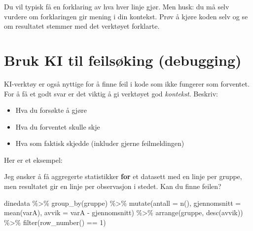 \documentclass[
  norsk,
  letterpaper,
  DIV=11,
  numbers=noendperiod]{scrreprt}
\newenvironment{Shaded}{\begin{snugshade}}{\end{snugshade}}
\newcommand{\AttributeTok}[1]{\textcolor[rgb]{0.40,0.45,0.13}{#1}}
\newcommand{\ControlFlowTok}[1]{\textcolor[rgb]{0.00,0.23,0.31}{\textbf{#1}}}
\newcommand{\DecValTok}[1]{\textcolor[rgb]{0.68,0.00,0.00}{#1}}
\newcommand{\FunctionTok}[1]{\textcolor[rgb]{0.28,0.35,0.67}{#1}}
\newcommand{\NormalTok}[1]{\textcolor[rgb]{0.00,0.23,0.31}{#1}}
\newcommand{\SpecialCharTok}[1]{\textcolor[rgb]{0.37,0.37,0.37}{#1}}
\providecommand{\tightlist}{%
  \setlength{\itemsep}{0pt}\setlength{\parskip}{0pt}}
\theoremstyle{definition}
\theoremstyle{remark}
\begin{document}
Du vil typisk få en forklaring av hva hver linje gjør. Men husk: du må
selv vurdere om forklaringen gir mening i din kontekst. Prøv å kjøre
koden selv og se om resultatet stemmer med det verktøyet forklarte.

\section{Bruk KI til feilsøking
(debugging)}\label{bruk-ki-til-feilsuxf8king-debugging}

KI-verktøy er også nyttige for å finne feil i kode som ikke fungerer som
forventet. For å få et godt svar er det viktig å gi verktøyet god
\emph{kontekst}. Beskriv:

\begin{itemize}
\tightlist
\item
  Hva du forsøkte å gjøre
\item
  Hva du forventet skulle skje
\item
  Hva som faktisk skjedde (inkluder gjerne feilmeldingen)
\end{itemize}

Her er et eksempel:

\begin{Shaded}
\begin{Highlighting}[]
\NormalTok{Jeg ønsker å få aggregerte statistikker }\ControlFlowTok{for}\NormalTok{ et datasett}
\NormalTok{med en linje per gruppe, men resultatet gir en linje}
\NormalTok{per observasjon i stedet. Kan du finne feilen?}

\NormalTok{  dinedata }\SpecialCharTok{\%\textgreater{}\%}
  \FunctionTok{group\_by}\NormalTok{(gruppe) }\SpecialCharTok{\%\textgreater{}\%}
  \FunctionTok{mutate}\NormalTok{(}\AttributeTok{antall =} \FunctionTok{n}\NormalTok{(), }\AttributeTok{gjennomsnitt =} \FunctionTok{mean}\NormalTok{(varA),}
         \AttributeTok{avvik =}\NormalTok{ varA }\SpecialCharTok{{-}}\NormalTok{ gjennomsnitt) }\SpecialCharTok{\%\textgreater{}\%}
  \FunctionTok{arrange}\NormalTok{(gruppe, }\FunctionTok{desc}\NormalTok{(avvik)) }\SpecialCharTok{\%\textgreater{}\%}
  \FunctionTok{filter}\NormalTok{(}\FunctionTok{row\_number}\NormalTok{() }\SpecialCharTok{==} \DecValTok{1}\NormalTok{)}
\end{Highlighting}
\end{Shaded}
\end{document}
